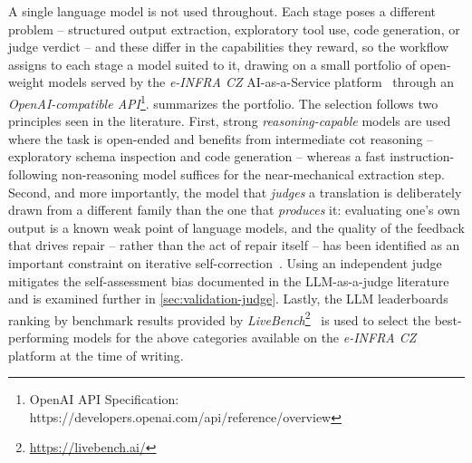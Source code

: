 A single language model is not used throughout. Each stage poses a different problem -- structured output extraction, exploratory tool use, code generation, or judge verdict -- and these differ in the capabilities they reward, so the workflow assigns to each stage a model suited to it, drawing on a small portfolio of open-weight models served by the \emph{e-INFRA CZ} AI-as-a-Service platform~\cite{einfraAIaaS} through an \emph{OpenAI-compatible API}\footnote{OpenAI API Specification: https://developers.openai.com/api/reference/overview}.  summarizes the portfolio. The selection follows two principles seen in the literature. First, strong \emph{reasoning-capable} models are used where the task is open-ended and benefits from intermediate \Acrfull{cot} reasoning -- exploratory schema inspection and code generation -- whereas a fast instruction-following non-reasoning model suffices for the near-mechanical extraction step. Second, and more importantly, the model that \emph{judges} a translation is deliberately drawn from a different family than the one that \emph{produces} it: evaluating one's own output is a known weak point of language models, and the quality of the feedback that drives repair -- rather than the act of repair itself -- has been identified as an important constraint on iterative self-correction~\cite{olaussonSelfRepair2024}. Using an independent judge mitigates the self-assessment bias documented in the LLM-as-a-judge literature~\cite{zhengJudgingLLMasaJudge2023} and is examined further in \cref{sec:validation-judge}. Lastly, the LLM leaderboards ranking by benchmark results provided by \emph{LiveBench}\footnote{\url{https://livebench.ai/}}~\cite{whiteLiveBenchChallengingContaminationLimited2025} is used to select the best-performing models for the above categories available on the \emph{e-INFRA CZ} platform at the time of writing.

